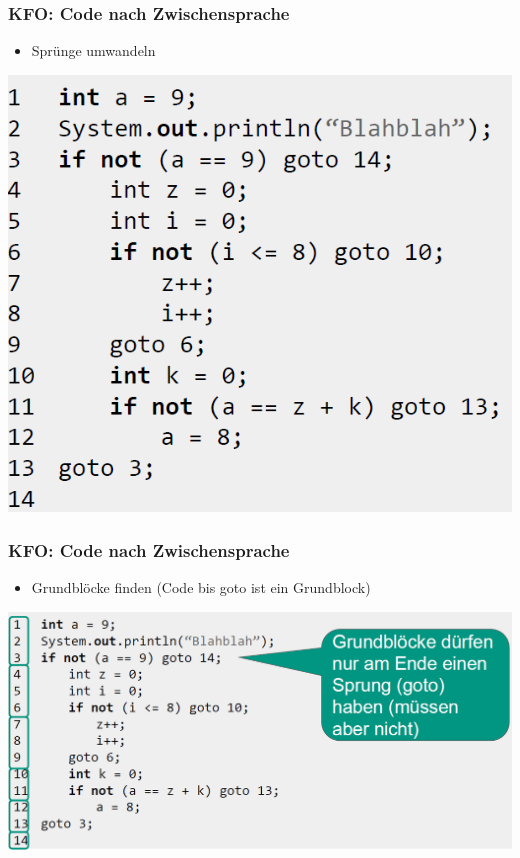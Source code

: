 \documentclass[18pt]{beamer}
\begin{document}
	\begin{frame}
		\frametitle{KFO: Code nach Zwischensprache}
		\begin{itemize}
			\item Sprünge umwandeln
		\end{itemize}
		\centering \includegraphics[scale=0.34]{./pics/tut5/code-jumps.png}
	\end{frame}

	\begin{frame}
		\frametitle{KFO: Code nach Zwischensprache}
		\begin{itemize}
			\item Grundblöcke finden (Code bis goto ist ein Grundblock)
		\end{itemize}
		\centering \includegraphics[scale=0.34]{./pics/tut5/first-blocks.png}
	\end{frame}
\end{document}

